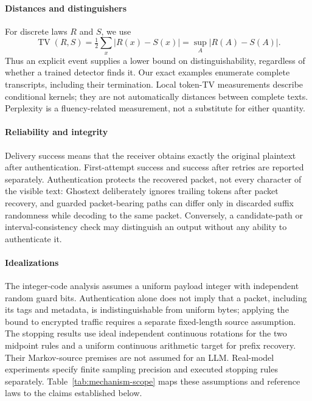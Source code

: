 \paragraph{Distances and distinguishers}
For discrete laws $R$ and $S$, we use
\begin{equation}
 \operatorname{TV}(R,S)=\tfrac12\sum_x |R(x)-S(x)|
 =\sup_A |R(A)-S(A)|.
\end{equation}
Thus an explicit event supplies a lower bound on distinguishability, regardless
of whether a trained detector finds it. Our exact examples enumerate complete
transcripts, including their termination. Local token-TV measurements describe
conditional kernels; they are not automatically distances between complete
texts. Perplexity is a fluency-related measurement, not a substitute for either
quantity.

\paragraph{Reliability and integrity}
Delivery success means that the receiver obtains exactly the original plaintext
after authentication. First-attempt success and success after retries are
reported separately. Authentication protects the recovered packet, not every
character of the visible text: Ghostext deliberately ignores trailing tokens
after packet recovery, and guarded packet-bearing paths can differ only in
discarded suffix randomness while decoding to the same packet.
Conversely, a candidate-path or interval-consistency
check may distinguish an output without any ability to authenticate it.

\paragraph{Idealizations}
The integer-code analysis assumes a uniform payload integer with independent
random guard bits. Authentication alone does not imply that a packet, including
its tags and metadata, is indistinguishable from uniform bytes; applying the
bound to encrypted traffic requires a separate fixed-length source assumption.
The stopping results use ideal independent continuous rotations for the two
midpoint rules and a uniform continuous arithmetic target for prefix recovery.
Their Markov-source premises are not assumed for an LLM. Real-model experiments
specify finite sampling precision and executed stopping rules separately.
Table~\ref{tab:mechanism-scope} maps these assumptions and reference laws to
the claims established below.


